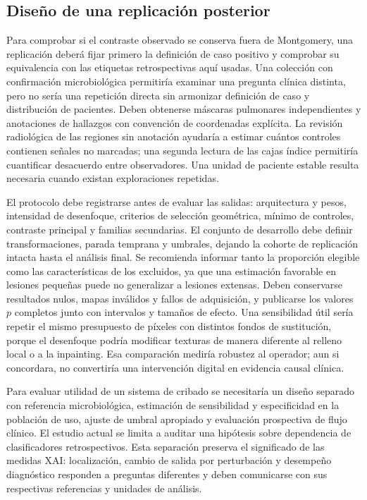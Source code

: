\documentclass[conference]{IEEEtran}
\begin{document}
\subsection{Diseño de una replicación posterior}
Para comprobar si el contraste observado se conserva fuera de Montgomery, una replicación deberá fijar primero la definición de caso positivo y comprobar su equivalencia con las etiquetas retrospectivas aquí usadas. Una colección con confirmación microbiológica permitiría examinar una pregunta clínica distinta, pero no sería una repetición directa sin armonizar definición de caso y distribución de pacientes. Deben obtenerse máscaras pulmonares independientes y anotaciones de hallazgos con convención de coordenadas explícita. La revisión radiológica de las regiones sin anotación ayudaría a estimar cuántos controles contienen señales no marcadas; una segunda lectura de las cajas índice permitiría cuantificar desacuerdo entre observadores. Una unidad de paciente estable resulta necesaria cuando existan exploraciones repetidas.

El protocolo debe registrarse antes de evaluar las salidas: arquitectura y pesos, intensidad de desenfoque, criterios de selección geométrica, mínimo de controles, contraste principal y familias secundarias. El conjunto de desarrollo debe definir transformaciones, parada temprana y umbrales, dejando la cohorte de replicación intacta hasta el análisis final. Se recomienda informar tanto la proporción elegible como las características de los excluidos, ya que una estimación favorable en lesiones pequeñas puede no generalizar a lesiones extensas. Deben conservarse resultados nulos, mapas inválidos y fallos de adquisición, y publicarse los valores $p$ completos junto con intervalos y tamaños de efecto. Una sensibilidad útil sería repetir el mismo presupuesto de píxeles con distintos fondos de sustitución, porque el desenfoque podría modificar texturas de manera diferente al relleno local o a la inpainting. Esa comparación mediría robustez al operador; aun si concordara, no convertiría una intervención digital en evidencia causal clínica.

Para evaluar utilidad de un sistema de cribado se necesitaría un diseño separado con referencia microbiológica, estimación de sensibilidad y especificidad en la población de uso, ajuste de umbral apropiado y evaluación prospectiva de flujo clínico. El estudio actual se limita a auditar una hipótesis sobre dependencia de clasificadores retrospectivos. Esta separación preserva el significado de las medidas XAI: localización, cambio de salida por perturbación y desempeño diagnóstico responden a preguntas diferentes y deben comunicarse con sus respectivas referencias y unidades de análisis.
\end{document}
